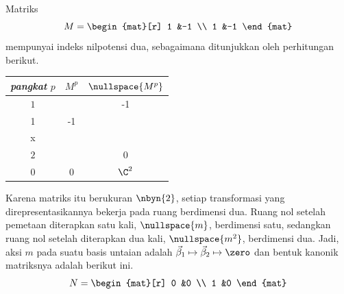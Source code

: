 \begin{example}
Matriks
\begin{equation*}
  M=\begin{mat}[r]
      1  &-1  \\
      1  &-1
    \end{mat}
\end{equation*}
mempunyai indeks nilpotensi dua, sebagaimana ditunjukkan oleh perhitungan berikut.
\begin{center}
  \begin{tabular}{c|cc}
    \multicolumn{1}{c}{\textit{pangkat} \( p \)}  &\( M^p \)  &\( \nullspace{M^p}  \)   \\  
    \hline
    \( 1 \)
    &\(  
       M=\matrixvenlarge{\begin{mat}[r]
         1  &-1  \\
         1  &-1
       \end{mat}}  \)
    &\( \set{\matrixvenlarge{\colvec{x \\ x}}\suchthat
                               x\in\C}  \)   \\
    \( 2 \)
    &\(  M^2=\matrixvenlarge{\begin{mat}[r]
         0  &0   \\
         0  &0
       \end{mat}}  \)
    &\( \C^2  \)
  \end{tabular}
\end{center}
Karena matriks itu berukuran $\nbyn{2}$, setiap transformasi yang
direpresentasikannya bekerja pada ruang berdimensi dua.
Ruang nol setelah pemetaan diterapkan satu kali,
$\nullspace{m}$, berdimensi satu, sedangkan
ruang nol setelah diterapkan dua kali, $\nullspace{m^2}$, berdimensi dua.
Jadi, aksi $m$ pada suatu basis untaian adalah
$\vec{\beta}_1\mapsto\vec{\beta}_2\mapsto\zero$ 
dan bentuk kanonik matriksnya adalah berikut ini.
\begin{equation*}
  N=\begin{mat}[r]
    0  &0  \\
    1  &0
  \end{mat}
\end{equation*}


\end{example}
